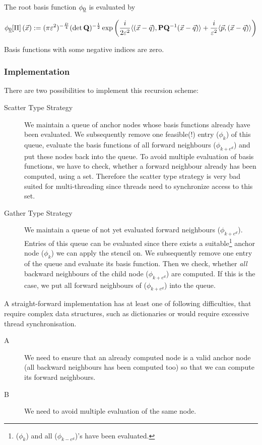 \documentclass{article}
\begin{document}
The root basis function \(\phi_{\underline{0}}\) is evaluated by

\begin{equation}
  \label{eq:phi0_Dd}
  \phi_{\underline{0}}[\Pi]\left(\vec{x}\right)
  :=
  (\pi\varepsilon^2)^{-\frac{D}{4}} (\det\mathbf{Q})^{-\frac{1}{2}}
  \exp \left( \frac{i}{2\varepsilon^2}
    \langle (\vec{x}-\vec{q}) , \mathbf{P}\mathbf{Q}^\mathrm{-1}(\vec{x}-\vec{q}) \rangle
    + \frac{i}{\varepsilon^2} \langle \vec{p} , (\vec{x}-\vec{q}) \rangle
  \right)
\end{equation}

Basis functions with some negative indices are zero.

\subsubsection{Implementation}
There are two possibilities to implement this recursion scheme:
\begin{description}
\item[Scatter Type Strategy] We maintain a queue of anchor nodes whose
  basis functions already have been evaluated.
  We subsequently remove one feasible(!) entry (\(\phi_k\)) of this queue,
  evaluate the basis functions of all forward
  neighbours (\(\phi_{k+e^d}\)) and put these nodes back into the
  queue. To avoid multiple evaluation of basis functions, we
  have to check, whether a forward neighbour already has been computed,
  using a set. Therefore the scatter type strategy is very bad suited
  for multi-threading since threads need to synchronize access to this
  set.
\item[Gather Type Strategy] We maintain a queue of not yet evaluated
  forward neighbours (\(\phi_{k+e^d}\)). Entries of this queue can be evaluated
  since there exists a suitable\footnote{(\(\phi_k\)) and all (\(\phi_{k-e^d}\))'s have been evaluated.}
  anchor node (\(\phi_k\)) we can apply the stencil on.
  We subsequently remove one entry of the queue and evaluate its basis function.
  Then we check, whether \emph{all} backward neighbours of the child
  node (\(\phi_{k+e^d}\)) are computed. If this is the case, we put all forward neighbours
  of (\(\phi_{k+e^d}\)) into the queue.
\end{description}

A straight-forward implementation has at least one of following
difficulties, that require complex data structures, such as dictionaries
or would require excessive thread synchronisation.
\begin{description}
\item[A] We need to ensure that an already computed node is a valid
  anchor node (all backward neighbours has been computed too) so that
  we can compute its forward neighbours.
\item[B] We need to avoid multiple evaluation of the same node.
\end{description}
\end{document}

